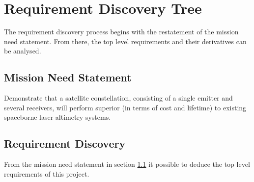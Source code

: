 \section{Requirement Discovery Tree}
\label{dlRDT}
The requirement discovery process begins with the restatement of the mission need statement. From there, the top level requirements and their derivatives can be analysed.
\subsection{Mission Need Statement}
\label{dsePPMNS}
Demonstrate that a satellite constellation, consisting of a single emitter and several receivers, will perform superior (in terms of cost and lifetime) to existing spaceborne laser altimetry systems.
\subsection{Requirement Discovery}
\label{dlReqDesq}
From the mission need statement in section \ref{dsePPMNS} it possible to deduce the top level requirements of this project. 